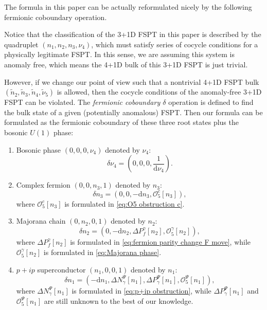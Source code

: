 \documentclass[%
 reprint,
 amsmath,amssymb,
 aps,
prb,
]{revtex4-2}
\begin{document}
The formula in this paper can be actually reformulated nicely by the following fermionic coboundary operation.

Notice that the classification of the 3+1D FSPT in this paper is described by the quadruplet $(n_1, n_2, n_3, \nu_4)$, which must satisfy series of cocycle conditions for a physically legitimate FSPT.
In this sense, we are assuming this system is anomaly free, which means the 4+1D bulk of this 3+1D FSPT is just trivial.

However, if we change our point of view such that a nontrivial 4+1D FSPT bulk $(\tilde n_2, \tilde n_3, \tilde n_4, \tilde \nu_5)$ is allowed, then the cocycle conditions of the anomaly-free 3+1D FSPT can be violated.
The \textit{fermionic coboundary $\delta$} operation is defined to find the bulk state of a given (potentially anomalous) FSPT.
Then our formula can be formulated as the fermionic coboundary of these three root states plus the bosonic $U(1)$ phase:
\begin{enumerate}
\item Bosonic phase $(0, 0, 0, \nu_4)$ denoted by $\nu_4$:
\begin{equation}
\delta \nu_4 = (0, 0, 0, \frac{1}{\mathrm{d} \nu_4}).
\end{equation}
\item Complex fermion $(0, 0, n_3, 1)$ denoted by $n_3$:
\begin{equation}
\delta n_3 = (0, 0, -\mathrm{d} n_3, \mathcal{O}_{5}^{c}[n_3]),
\end{equation}
where $\mathcal{O}_{5}^{c}[n_3]$ is formulated in \eqref{eq:O5 obstruction c}.
\item Majorana chain $(0, n_2, 0, 1)$ denoted by $n_2$:
\begin{equation}
\delta n_2 = (0, -\mathrm{d} n_2, \Delta P^{\gamma}_f[n_2], \mathcal{O}_{5}^{\gamma}[n_2]),
\end{equation}
where $\Delta P^{\gamma}_f[n_2]$ is formulated in \eqref{eq:fermion parity change F move}, while $\mathcal{O}_{5}^{\gamma}[n_2]$ is formulated in \eqref{eq:Majorana phase}.
\item $p+ip$ superconductor $(n_1, 0, 0, 1)$ denoted by $n_1$:
\begin{equation}
\delta n_1 = (-\mathrm{d} n_1, \Delta N_{\gamma}^{\Psi}[n_1], \Delta P^{\Psi}_{\gamma}[n_1], \mathcal{O}_{5}^{\Psi}[n_1]),
\end{equation}
where $\Delta N_{\gamma}^{\Psi}[n_1]$ is formulated in \eqref{eq:p+ip obstruction}, while $\Delta P^{\Psi}_{\gamma}[n_1]$ and $\mathcal{O}_{5}^{\Psi}[n_1]$ are still unknown to the best of our knowledge.
\end{enumerate}
\end{document}
